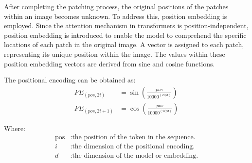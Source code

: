 \noindent After completing the patching process, the original positions of the patches within an image becomes unknown. To address this, position embedding is employed. Since the attention mechanism in transformers is position-independent, position embedding is introduced to enable the model to comprehend the specific locations of each patch in the original image. A vector is assigned to each patch, representing its unique position within the image. The values within these position embedding vectors are derived from sine and cosine functions.

\noindent The positional encoding can be obtained as:
\begin{align}
    PE_{(pos, 2i)}   & = \sin\left(\frac{pos}{{10000}^{(2i/d)}}\right) \label{eq:pos_encoding_sin} \\
    PE_{(pos, 2i+1)} & = \cos\left(\frac{pos}{{10000}^{(2i/d)}}\right) \label{eq:pos_encoding_cos}
\end{align}

\noindent Where:
\begin{align*}
    \text{pos} & : \text{the position of the token in the sequence.} \\
    i          & : \text{the dimension of the positional encoding.}  \\
    d          & : \text{the dimension of the model or embedding.}
\end{align*}


